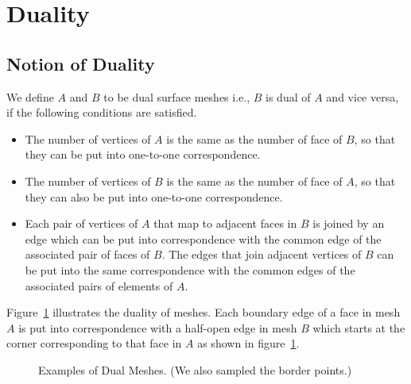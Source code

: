 \documentclass{InsightArticle}
\begin{document}
\section{Duality}
\subsection{Notion of Duality}
We define $A$ and $B$ to be dual surface meshes i.e., $B$ is dual of $A$ and vice versa, if the following conditions are satisfied.
\begin{itemize}
	\item The number of vertices of $A$ is the same as the number of face of $B$, so that they can be put into one-to-one correspondence.
	\item The number of vertices of $B$ is the same as the number of face of $A$, so that they can also be put into one-to-one correspondence.
	\item Each pair of vertices of $A$ that map to adjacent faces in $B$ is joined by an edge which can be put into correspondence with the common edge of the associated pair of faces of $B$. The edges that join adjacent vertices of $B$ can be put into the same correspondence with the common edges of the associated pairs of elements of $A$. 
\end{itemize}
Figure~\ref{fig:dualMeshes} illustrates the duality of meshes. Each boundary edge of a face in mesh $A$ is put into correspondence with a half-open edge in mesh $B$ which starts at the corner corresponding to that face in $A$ as shown in figure~\ref{fig:dualMeshes}.
\begin{figure}[!t]
	\centering
	\caption{Examples of Dual Meshes. (We also sampled the border points.)}
	\label{fig:dualMeshes}
\end{figure}
\end{document}
